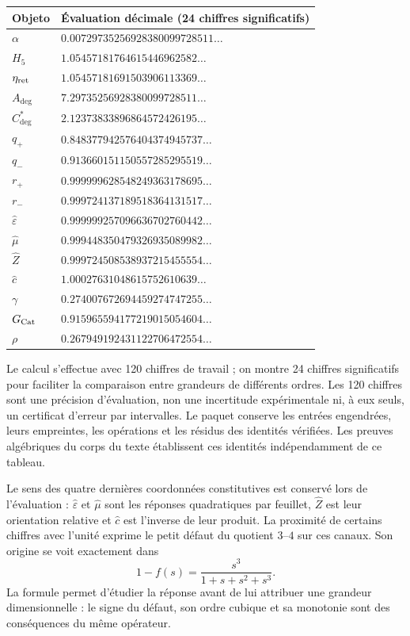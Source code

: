 \begin{longtable}{@{}ll@{}}
\toprule
Objeto & Évaluation décimale (24 chiffres significatifs)\\
\midrule\endhead
$\alpha$ & $0.00729735256928380099728511\ldots$ \\
$H_5$ & $1.05457181764615446962582\ldots$ \\
$\eta_{\rm ret}$ & $1.05457181691503906113369\ldots$ \\
$A_{\deg}$ & $7.29735256928380099728511\ldots$ \\
$C^*_{\deg}$ & $2.12373833896864572426195\ldots$ \\
$q_+$ & $0.848377942576404374945737\ldots$ \\
$q_-$ & $0.913660151150557285295519\ldots$ \\
$r_+$ & $0.999999628548249363178695\ldots$ \\
$r_-$ & $0.999724137189518364131517\ldots$ \\
$\widehat\varepsilon$ & $0.999999257096636702760442\ldots$ \\
$\widehat\mu$ & $0.999448350479326935089982\ldots$ \\
$\widehat Z$ & $0.999724508538937215455554\ldots$ \\
$\widehat c$ & $1.00027631048615752610639\ldots$ \\
$\gamma$ & $0.274007672694459274747255\ldots$ \\
$G_{\rm Cat}$ & $0.915965594177219015054604\ldots$ \\
$\rho$ & $0.267949192431122706472554\ldots$ \\
\bottomrule
\end{longtable}


Le calcul s’effectue avec 120 chiffres de travail ; on montre 24 chiffres
significatifs pour faciliter la comparaison entre grandeurs de différents
ordres. Les 120 chiffres sont une précision d’évaluation, non une incertitude
expérimentale ni, à eux seuls, un certificat d’erreur par intervalles.
Le paquet conserve les entrées engendrées, leurs empreintes, les opérations et
les résidus des identités vérifiées. Les preuves algébriques du
corps du texte établissent ces identités indépendamment de ce tableau.

Le sens des quatre dernières coordonnées constitutives est conservé
lors de l’évaluation : $\widehat\varepsilon$ et $\widehat\mu$ sont les réponses
quadratiques par feuillet, $\widehat Z$ est leur orientation relative et
$\widehat c$ est l’inverse de leur produit. La proximité de certains chiffres avec
l’unité exprime le petit défaut du quotient $3$--$4$ sur ces
canaux. Son origine se voit exactement dans
\[
 1-f(s)=\frac{s^3}{1+s+s^2+s^3}.
\]
La formule permet d’étudier la réponse avant de lui attribuer une grandeur
dimensionnelle : le signe du défaut, son ordre cubique et sa monotonie sont
des conséquences du même opérateur.

